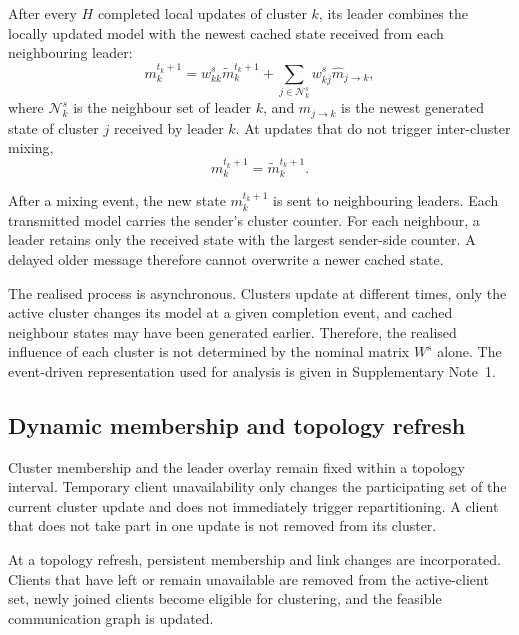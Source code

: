 \documentclass[pdflatex,sn-mathphys-num]{sn-jnl}
\begin{document}
After every \(H\) completed local updates of cluster \(k\), its leader combines the locally updated model with the newest cached state received from each neighbouring leader:
\begin{equation}
m_k^{t_k+1}
=
w_{kk}^s
\widetilde{m}_k^{t_k+1}
+
\sum_{j\in\mathcal{N}_k^s}
w_{kj}^s
\widehat{m}_{j\rightarrow k},
\label{eq:asynchronous_mixing}
\end{equation}
where \(\mathcal{N}_k^s\) is the neighbour set of leader \(k\), and \(\widehat{m}_{j\rightarrow k}\) is the newest generated state of cluster \(j\) received by leader \(k\). At updates that do not trigger inter-cluster mixing,
\begin{equation}
m_k^{t_k+1}
=
\widetilde{m}_k^{t_k+1}.
\label{eq:no_mixing_update}
\end{equation}

After a mixing event, the new state \(m_k^{t_k+1}\) is sent to neighbouring leaders. Each transmitted model carries the sender's cluster counter. For each neighbour, a leader retains only the received state with the largest sender-side counter. A delayed older message therefore cannot overwrite a newer cached state.

The realised process is asynchronous. Clusters update at different times, only the active cluster changes its model at a given completion event, and cached neighbour states may have been generated earlier. Therefore, the realised influence of each cluster is not determined by the nominal matrix \(W^s\) alone. The event-driven representation used for analysis is given in Supplementary Note~1.


\subsection{Dynamic membership and topology refresh}
\label{subsec:dynamic_membership}

Cluster membership and the leader overlay remain fixed within a topology interval. Temporary client unavailability only changes the participating set of the current cluster update and does not immediately trigger repartitioning. A client that does not take part in one update is not removed from its cluster.

At a topology refresh, persistent membership and link changes are incorporated. Clients that have left or remain unavailable are removed from the active-client set, newly joined clients become eligible for clustering, and the feasible communication graph is updated.
\end{document}
